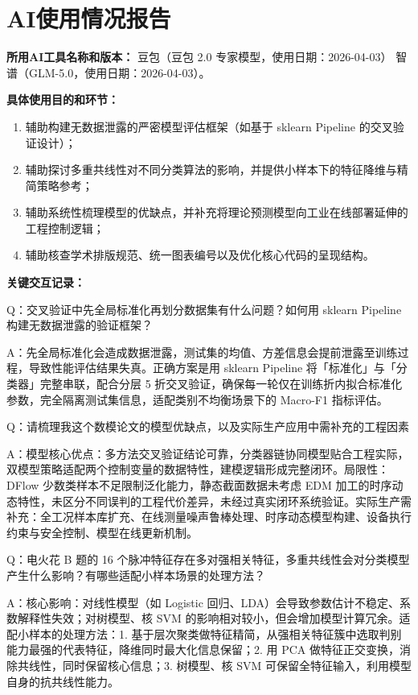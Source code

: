 \documentclass[UTF8,a4paper,12pt]{ctexart}
\begin{document}
\section*{AI使用情况报告}

\noindent\textbf{所用AI工具名称和版本：} 
豆包（豆包 2.0 专家模型，使用日期：2026-04-03）
智谱（GLM-5.0，使用日期：2026-04-03）。

\noindent\textbf{具体使用目的和环节：}
\begin{enumerate}[label=(\arabic*),leftmargin=2em]
\item 辅助构建无数据泄露的严密模型评估框架（如基于 sklearn Pipeline 的交叉验证设计）；
\item 辅助探讨多重共线性对不同分类算法的影响，并提供小样本下的特征降维与精简策略参考；
\item 辅助系统性梳理模型的优缺点，并补充将理论预测模型向工业在线部署延伸的工程控制逻辑；
\item 辅助核查学术排版规范、统一图表编号以及优化核心代码的呈现结构。
\end{enumerate}

\noindent\textbf{关键交互记录：}

Q：交叉验证中先全局标准化再划分数据集有什么问题？如何用 sklearn Pipeline 构建无数据泄露的验证框架？

A：先全局标准化会造成数据泄露，测试集的均值、方差信息会提前泄露至训练过程，导致性能评估结果失真。正确方案是用 sklearn Pipeline 将「标准化」与「分类器」完整串联，配合分层 5 折交叉验证，确保每一轮仅在训练折内拟合标准化参数，完全隔离测试集信息，适配类别不均衡场景下的 Macro-F1 指标评估。

\vspace{0.8em}
Q：请梳理我这个数模论文的模型优缺点，以及实际生产应用中需补充的工程因素

A：模型核心优点：多方法交叉验证结论可靠，分类器链协同模型贴合工程实际，双模型策略适配两个控制变量的数据特性，建模逻辑形成完整闭环。局限性：DFlow 少数类样本不足限制泛化能力，静态截面数据未考虑 EDM 加工的时序动态特性，未区分不同误判的工程代价差异，未经过真实闭环系统验证。实际生产需补充：全工况样本库扩充、在线测量噪声鲁棒处理、时序动态模型构建、设备执行约束与安全控制、模型在线更新机制。

\vspace{0.8em}
Q：电火花 B 题的 16 个脉冲特征存在多对强相关特征，多重共线性会对分类模型产生什么影响？有哪些适配小样本场景的处理方法？

A：核心影响：对线性模型（如 Logistic 回归、LDA）会导致参数估计不稳定、系数解释性失效；对树模型、核 SVM 的影响相对较小，但会增加模型计算冗余。适配小样本的处理方法：1. 基于层次聚类做特征精简，从强相关特征簇中选取判别能力最强的代表特征，降维同时最大化信息保留；2. 用 PCA 做特征正交变换，消除共线性，同时保留核心信息；3. 树模型、核 SVM 可保留全特征输入，利用模型自身的抗共线性能力。
\end{document}
